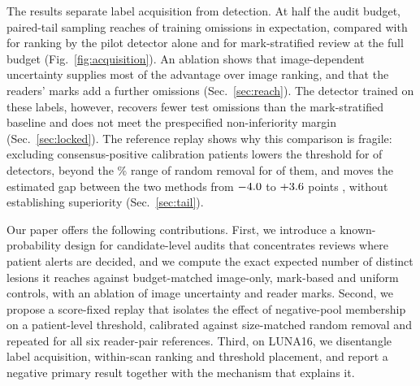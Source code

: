 The results separate label acquisition from detection. At half the audit budget, paired-tail sampling reaches \ReachPair{} of \NOmitTrain{} training omissions in expectation, compared with \ReachImage{} for ranking by the pilot detector alone and \ReachMark{} for mark-stratified review at the full budget (Fig.~\ref{fig:acquisition}). An ablation shows that image-dependent uncertainty supplies most of the advantage over image ranking, and that the readers' marks add a further \AblGain{} omissions (Sec.~\ref{sec:reach}). The detector trained on these labels, however, recovers fewer test omissions than the mark-stratified baseline and does not meet the prespecified non-inferiority margin (Sec.~\ref{sec:locked}). The reference replay shows why this comparison is fragile: excluding \NExcluded{} consensus-positive calibration patients lowers the threshold for \LowerHeads{} of \NHeads{} detectors, beyond the \CILevel\% range of random removal for \PastBand{} of them, and moves the estimated gap between the two methods from $-4.0$ to $+3.6$ points \PairRelativeUCI{}, without establishing superiority (Sec.~\ref{sec:tail}).

Our paper offers the following contributions. First, we introduce a known-probability design for candidate-level audits that concentrates reviews where patient alerts are decided, and we compute the exact expected number of distinct lesions it reaches against budget-matched image-only, mark-based and uniform controls, with an ablation of image uncertainty and reader marks. Second, we propose a score-fixed replay that isolates the effect of negative-pool membership on a patient-level threshold, calibrated against size-matched random removal and repeated for all six reader-pair references. Third, on LUNA16, we disentangle label acquisition, within-scan ranking and threshold placement, and report a negative primary result together with the mechanism that explains it.

